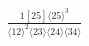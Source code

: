 \documentclass[varwidth, border=5pt]{standalone}
\begin{document}
\begin{my}
$\begin{gathered}
\scriptscriptstyle\frac{1[25]⟨25⟩^3}{⟨12⟩^2⟨23⟩⟨24⟩⟨34⟩}
\end{gathered}$
\end{my}
\end{document}
